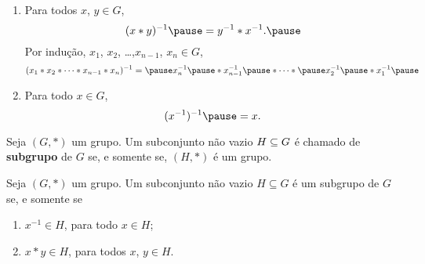 \documentclass{beamer}
\begin{document}
    \begin{frame}
        \begin{proposicao}
            \begin{enumerate}[label={\roman*})]

                \conti

                \item Para todos $x$, $y \in G$,\pause
                \[
                    (x*y)^{-1} \pause = y^{-1}*x^{-1}.\pause
                \]
                Por indução, \pause $x_1$, $x_2$, \dots ,$x_{n-1}$, $x_n \in G$,\pause
                \[
                    (x_1*x_2*\cdots *x_{n-1}*x_{n})^{-1} = \pause x^{-1}_{n}\pause *x^{-1}_{n-1}\pause *\cdots *\pause x^{-1}_2\pause *x^{-1}_1\pause
                \]
                \item Para todo $x \in G$, \pause
                \[
                    (x^{-1})^{-1} \pause = x.
                \]
            \end{enumerate}
        \end{proposicao}
    \end{frame}

    \begin{frame}
        \begin{definicao}
            Seja $(G,*)$ um grupo. \pause Um subconjunto não vazio \pause $H\subseteq G$ \pause é chamado de \textbf{subgrupo} de $G$ \pause se, e somente se, $(H,*)$ \pause é um grupo.\pause
        \end{definicao}

        \begin{proposicao}
            Seja $(G, *)$ um grupo. \pause Um subconjunto não vazio \pause $H\subseteq G$ é um subgrupo de $G$ \pause se, e somente se\pause
            \begin{enumerate}[label={\roman*})]
                \item\label{subgrupo_condicao_1} $x^{-1}\in H$, \pause para todo $x \in H$;
                \item\label{subgrupo_condicao_2} $x*y\in H$, \pause para todos $x$, $y \in H$.\pause
            \end{enumerate}
        \end{proposicao}
    \end{frame}
\end{document}
